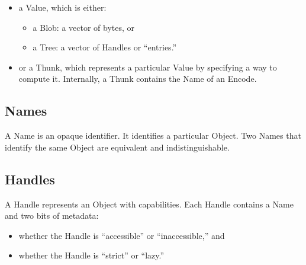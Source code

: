 \documentclass{article}
\newcommand{\blob}{\textrm{Blob}\xspace}
\newcommand{\valuex}{\textrm{Value}\xspace}
\newcommand{\object}{\textrm{Object}\xspace}
\newcommand{\encode}{\textrm{Encode}\xspace}
\newcommand{\thunk}{\textrm{Thunk}\xspace}
\newcommand{\name}{\textrm{Name}\xspace}
\newcommand{\names}{\textrm{Name}s\xspace}
\newcommand{\tree}{\textrm{Tree}\xspace}
\newcommand{\handle}{\textrm{Handle}\xspace}
\newcommand{\handles}{\textrm{Handle}s\xspace}
\begin{document}
\begin{itemize}[itemsep=0pt,topsep=0pt]
\item a \valuex, which is either:
\begin{itemize}[itemsep=0pt,topsep=0pt]
  \item a \blob: a vector of bytes, or

  \item a \tree: a vector of \handles or ``entries.''
\end{itemize}

\item or a \thunk, which represents a particular \valuex by specifying
  a way to compute it. Internally, a \thunk contains the \name of an \encode.
\end{itemize}


\subsection{\names}

A \name is an opaque identifier. It identifies a particular
\object. Two \names that identify the same \object are equivalent and
indistinguishable.



\enlargethispage{1 cm}

\subsection{\handles}

A \handle represents an \object with capabilities. Each \handle contains a \name and two bits of metadata:
      \begin{itemize}[itemsep=0pt]
      \item whether the \handle is ``accessible'' or ``inaccessible,'' and
      \item whether the \handle is ``strict'' or ``lazy.''
      \end{itemize}
    
\end{document}
